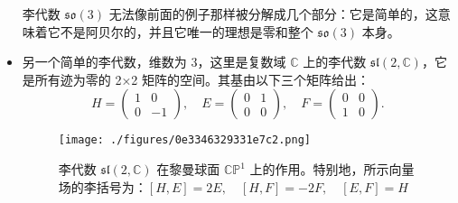 \begin{itemize}
李代数 \( \mathfrak{so}(3) \) 无法像前面的例子那样被分解成几个部分：它是简单的，这意味着它不是阿贝尔的，并且它唯一的理想是零和整个 \( \mathfrak{so}(3) \) 本身。
\item 另一个简单的李代数，维数为 3，这里是复数域 \( \mathbb{C} \) 上的李代数 \( \mathfrak{sl}(2, \mathbb{C}) \)，它是所有迹为零的 2×2 矩阵的空间。其基由以下三个矩阵给出：
\[
H = \left( \begin{array}{cc} 1 & 0 \\ 0 & -1 \end{array} \right), \quad E = \left( \begin{array}{cc} 0 & 1 \\ 0 & 0 \end{array} \right), \quad F = \left( \begin{array}{cc} 0 & 0 \\ 1 & 0 \end{array} \right).~
\]
\begin{figure}[ht]
\centering
\texttt{[image: ./figures/0e3346329331e7c2.png]}
\caption{李代数 \( \mathfrak{sl}(2, \mathbb{C}) \) 在黎曼球面 \( \mathbb{CP}^1 \) 上的作用。特别地，所示向量场的李括号为：\([H, E] = 2E, \quad [H, F] = -2F, \quad [E, F] = H\)} \label{fig_LieDS_1}
\end{figure}
\end{itemize}